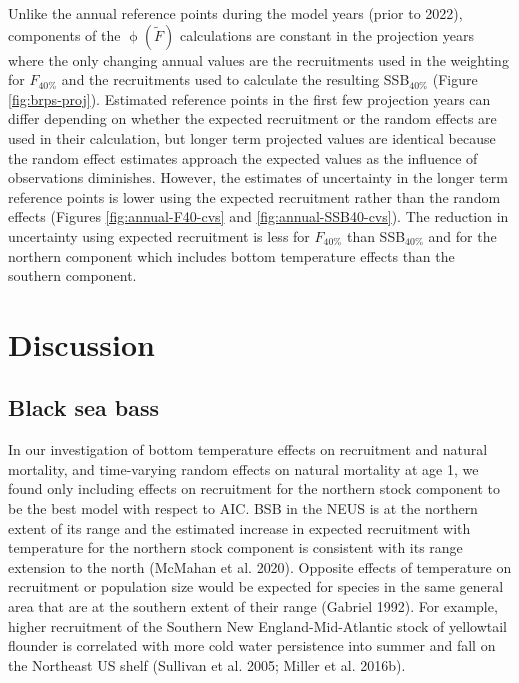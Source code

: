 \documentclass[
]{article}
\begin{document}
Unlike the annual reference points during the model years (prior to 2022), components of the \(\upphi(\widetilde{F})\) calculations are constant in the projection years where the only changing annual values are the recruitments used in the weighting for \(F_{40\%}\) and the recruitments used to calculate the resulting SSB\(_{40\%}\) (Figure \ref{fig:brps-proj}). Estimated reference points in the first few projection years can differ depending on whether the expected recruitment or the random effects are used in their calculation, but longer term projected values are identical because the random effect estimates approach the expected values as the influence of observations diminishes. However, the estimates of uncertainty in the longer term reference points is lower using the expected recruitment rather than the random effects (Figures \ref{fig:annual-F40-cvs} and \ref{fig:annual-SSB40-cvs}). The reduction in uncertainty using expected recruitment is less for \(F_{40\%}\) than SSB\(_{40\%}\) and for the northern component which includes bottom temperature effects than the southern component.

\hypertarget{discussion}{%
\section*{Discussion}\label{discussion}}

\hypertarget{black-sea-bass}{%
\subsection*{Black sea bass}\label{black-sea-bass}}

In our investigation of bottom temperature effects on recruitment and natural mortality, and time-varying random effects on natural mortality at age 1, we found only including effects on recruitment for the northern stock component to be the best model with respect to AIC. BSB in the NEUS is at the northern extent of its range and the estimated increase in expected recruitment with temperature for the northern stock component is consistent with its range extension to the north (McMahan et al. 2020). Opposite effects of temperature on recruitment or population size would be expected for species in the same general area that are at the southern extent of their range (Gabriel 1992). For example, higher recruitment of the Southern New England-Mid-Atlantic stock of yellowtail flounder is correlated with more cold water persistence into summer and fall on the Northeast US shelf (Sullivan et al. 2005; Miller et al. 2016b).
\end{document}
